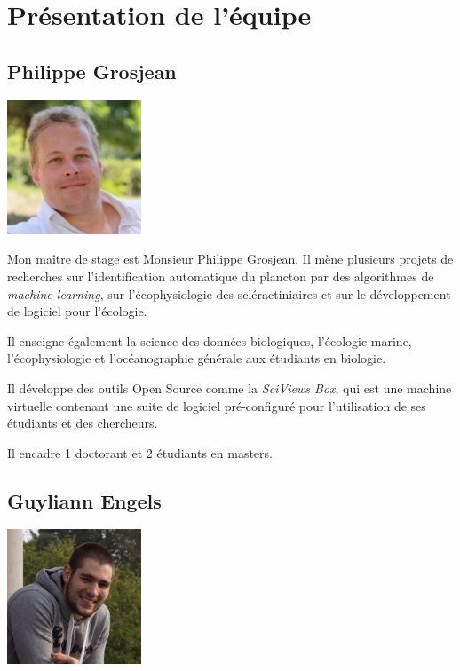 \documentclass[]{report}
\begin{document}
\section{Présentation de l'équipe}\label{presentation-de-lequipe}

\subsection{Philippe Grosjean}\label{philippe-grosjean}

\includegraphics[width=4.00000cm]{../image/Grosjean2.jpg}

Mon maître de stage est Monsieur Philippe Grosjean. Il mène plusieurs
projets de recherches sur l'identification automatique du plancton par
des algorithmes de \emph{machine learning}, sur l'écophysiologie des
scléractiniaires et sur le développement de logiciel pour l'écologie.

Il enseigne également la science des données biologiques, l'écologie
marine, l'écophysiologie et l'océanographie générale aux étudiants en
biologie.

Il développe des outils Open Source comme la \emph{SciViews Box}, qui
est une machine virtuelle contenant une suite de logiciel pré-configuré
pour l'utilisation de ses étudiants et des chercheurs.

Il encadre 1 doctorant et 2 étudiants en masters.

\subsection{Guyliann Engels}\label{guyliann-engels}

\includegraphics[width=4.00000cm]{../image/Guyliann.jpg}
\end{document}
